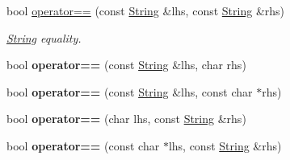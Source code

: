 {\bf }\par
\begin{DoxyCompactItemize}
\item 
bool \hyperlink{classString_a57204d6cb68b449d9db9eae4883571c1}{operator==} (const \hyperlink{classString}{String} \&lhs, const \hyperlink{classString}{String} \&rhs)
\begin{DoxyCompactList}\small\item\em \hyperlink{classString}{String} equality. \end{DoxyCompactList}\item 
\hypertarget{classString_a6f9d141bc5ef2571a65edbafa57f5708}{bool {\bfseries operator==} (const \hyperlink{classString}{String} \&lhs, char rhs)}\label{classString_a6f9d141bc5ef2571a65edbafa57f5708}

\item 
\hypertarget{classString_a4cf760d9d1b68bcf1cd43e9f5c54feb1}{bool {\bfseries operator==} (const \hyperlink{classString}{String} \&lhs, const char $\ast$rhs)}\label{classString_a4cf760d9d1b68bcf1cd43e9f5c54feb1}

\item 
\hypertarget{classString_a8db8b666adbd8720eabaa9da7de0d7e7}{bool {\bfseries operator==} (char lhs, const \hyperlink{classString}{String} \&rhs)}\label{classString_a8db8b666adbd8720eabaa9da7de0d7e7}

\item 
\hypertarget{classString_a0ccb8b7286ed4a45f31b6c936a9a98c2}{bool {\bfseries operator==} (const char $\ast$lhs, const \hyperlink{classString}{String} \&rhs)}\label{classString_a0ccb8b7286ed4a45f31b6c936a9a98c2}

\end{DoxyCompactItemize}

